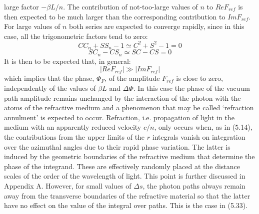 {     large factor $-\beta L/n$. The contribution of not-too-large values of $n$ to $ Re F_{ref}$
      is then expected to be much larger than the corresponding contribution to $Im F_{ref}$.
     For large values of $n$ both series are expected to converge rapidly, since in this case,
     all the trigonometric factors tend to zero:
    \[ C C_n+S S_n-1 \simeq C^2+S^2-1 = 0 \]
   \[ S C_n- C S_n \simeq SC-CS = 0 \]  
     It is then to be expected that, in general:
     \[ | Re F_{ref}| \gg | Im F_{ref}| \]
         which implies that the phase, $\Phi_F$, of the amplitude $ F_{ref}$
       is close to zero, independently of the values of  $\beta L$ and  $\Delta \Phi$. 
     In this case the phase of the vacuum path amplitude remains unchanged by the 
     interaction of the photon with the atoms of the refractive medium and
     a phenomenon that may be called `refraction annulment' is expected to occur.    
      Refraction, i.e. propagation of light in the medium with an apparently reduced
     velocity $c/n$, only occurs when, as in (5.14), the contributions from
     the upper limits of the $r$ integrals vanish on integration
    over the azimuthal angles due to their rapid phase variation.
     The latter is induced by the geometric boundaries of the refractive
     medium that determine the phase of the integrand.
    These are effectively randomly placed at the distance scales of the order 
     of the wavelength of light. This point
     is further discussed in Appendix A. However, for small values of $\Delta s$, the photon paths
     always remain away from the transverse boundaries of the refractive material so that the latter
     have no effect on the value of the integral over paths. This is the case in (5.33).
 
}
